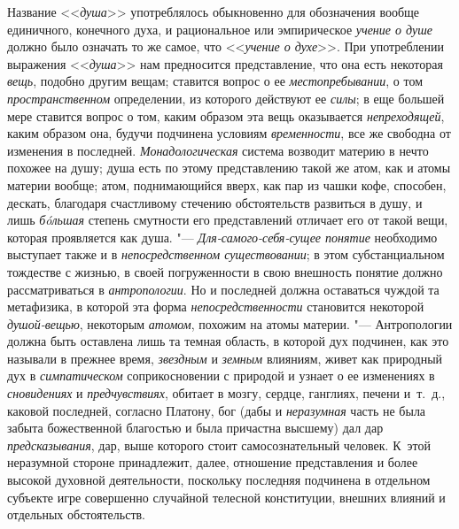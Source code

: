 {{Название <<{\em душа}>>
употреблялось обыкновенно для обозначения
вообще единичного, конечного духа, и рациональное или эмпирическое
{\em учение о душе}
должно было означать то же самое, что
<<{\em учение о духе}>>.
При употреблении выражения
<<{\em душа}>> нам
предносится представление, что она есть некоторая
{\em вещь}, подобно
другим вещам; ставится вопрос о ее
{\em местопребывании}, о
том {\em пространственном}
определении, из которого действуют ее
{\em силы}; в еще большей
мере ставится вопрос о том, каким образом эта вещь оказывается
{\em непреходящей}, каким
образом она, будучи подчинена условиям
{\em временности}, все же
свободна от изменения в последней.
{\em Монадологическая}
система возводит материю в нечто похожее на душу; душа есть
по этому представлению такой же атом, как и атомы материи вообще; атом,
поднимающийся вверх, как пар из чашки кофе, способен, дескать, благодаря
счастливому стечению обстоятельств развиться в душу, и лишь
{\em бóльшая} степень
смутности его представлений отличает его от такой вещи, которая проявляется
как душа. "--- {\em Для-самого-себя-сущее
понятие} необходимо выступает также и в
{\em непосредственном существовании};
в этом субстанциальном тождестве с жизнью, в своей
погруженности в свою внешность понятие должно рассматриваться в
{\em антропологии}. Но и
последней должна оставаться чуждой та метафизика, в которой эта форма
{\em непосредственности}
становится некоторой
{\em душой-вещью},
некоторым {\em атомом},
похожим на атомы материи. "--- Антропологии
должна быть оставлена лишь та темная область, в которой дух подчинен, как
это называли в прежнее время,
{\em звездным} и
{\em земным} влияниям,
живет как природный дух в
{\em симпатическом}
соприкосновении с природой и узнает о ее изменениях в
{\em сновидениях} и
{\em предчувствиях},
обитает в мозгу, сердце, ганглиях, печени и~т.~д., каковой
последней, согласно Платону, бог (дабы и
{\em неразумная} часть не
была забыта божественной благостью и была причастна высшему) дал дар
{\em предсказывания},
дар, выше которого стоит самосознательный человек. К~этой
неразумной стороне принадлежит, далее, отношение
представления и более высокой духовной деятельности, поскольку последняя
подчинена в отдельном субъекте игре совершенно случайной телесной
конституции, внешних влияний и отдельных обстоятельств.

}}
